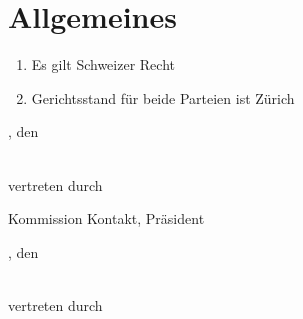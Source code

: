 \section{Allgemeines}
\begin{enumerate}
\item Es gilt Schweizer Recht
\item Gerichtsstand für beide Parteien ist Zürich
\end{enumerate}

\vfill
\noindent
\begin{minipage}[t]{0.45\textwidth}
\amivcity, den \hrulefill

\bigskip\noindent
\amivname\\
vertreten durch

\vspace{4em}
\hrulefill

\amivkontaktpresident

Kommission Kontakt, Präsident
\end{minipage}%
\hspace{0.1\textwidth}
\begin{minipage}[t]{0.45\textwidth}
\makebox[8em]{\hrulefill}, den \hrulefill

\bigskip\noindent
\companyname\\
vertreten durch

\vspace{4em}
\hrulefill

\companycontact\vphantom{Ensure correct height.}\\

\end{minipage}
